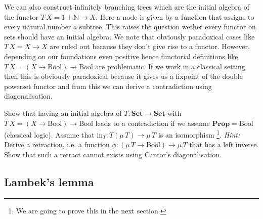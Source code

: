 \documentclass{article}
\newcommand{\Prop}{\mathbf{Prop}}
\newcommand{\Set}{\mathbf{Set}}
\newcommand{\Bool}{\mathrm{Bool}}
\newcommand{\Nat}{\mathbb{N}}
\newcommand{\inn}{\mathrm{in}}
\begin{document}
We can also construct infinitely branching trees which are the initial algebra of the functor $T\,X = 1 + \Nat \to X$. Here a node is given by a function that assigns to every natural number a subtree. This raises the question wether every functor on sets should have an initial algebra. We note that obviously paradoxical cases like $T\,X = X \to X$ are ruled out because they don't give rise to a functor. However, depending on our foundations even positive hence functorial definitions like $T\,X = (X \to \Bool) \to \Bool$ are problematic. If we work in a classical setting then this is obviously paradoxical because it gives us a fixpoint of the double powerset functor and from this we can derive a contradiction using diagonalisation.
\begin{Exercise}
Show that having an initial algebra of $T : \Set \to \Set$ with $T\,X = (X \to \Bool) \to \Bool$ leads to a contradiction if we assume $\Prop = \Bool$ (classical logic). Assume that $\inn_T : T (\mu\,T) \to \mu\,T$ is an isomorphism
\footnote{We are going to prove this in the next section.}.
\emph{Hint:} Derive a retraction, i.e. a function $\phi : (\mu\,T \to \Bool) \to \mu\,T$ that has a left inverse. Show that such a retract cannot exists using Cantor's diagonalisation.
\end{Exercise}

\subsection{Lambek's lemma}
\label{sec:lambeks-lemma}
\end{document}
